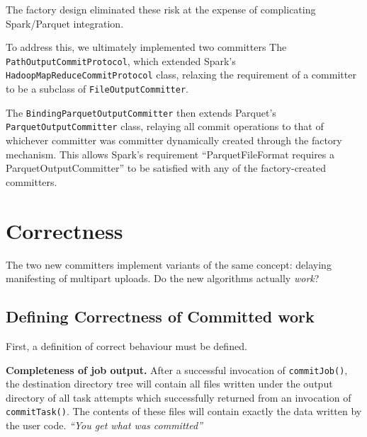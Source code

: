 \documentclass[conference]{IEEEtran}
\begin{document}
The factory design eliminated these risk at the expense of complicating
Spark/Parquet integration.

To address this, we ultimately implemented two committers
The \texttt{PathOutputCommitProtocol}, which extended Spark's
\texttt{HadoopMapReduceCommitProtocol} class, relaxing the requirement of a
committer to be a subclass of \texttt{FileOutputCommitter}.

The \texttt{BindingParquetOutputCommitter} then extends Parquet's
\texttt{ParquetOutputCommitter} class, relaying
all commit operations to that of whichever committer was committer dynamically created
through the factory mechanism.
This allows Spark's requirement  ``ParquetFileFormat requires a ParquetOutputCommitter''
to be satisfied with any of the factory-created committers.




\section{Correctness}
\label{sec:correctness}

The two new committers implement variants of the same concept: delaying
manifesting of multipart uploads.
Do the new algorithms actually \emph{work}?


\subsection{Defining Correctness of Committed work}

First, a definition of correct behaviour must be defined.

  \textbf{Completeness of job output.}
  After a successful invocation of \texttt{commitJob()},
  the destination directory tree will contain all files written under the output directory
  of all task attempts which successfully returned from an invocation of \texttt{commitTask()}.
  The contents of these files will contain exactly the data written by the user code.
  \emph{``You get what was committed''}
\end{document}
